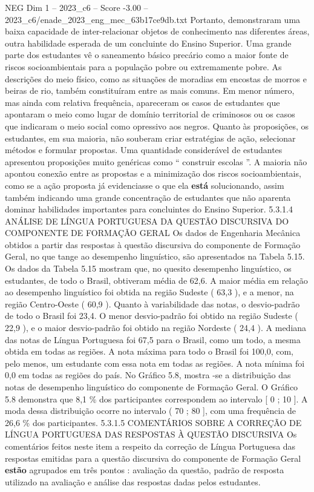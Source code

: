 \begin{textsample}{NEG Dim 1 – 2023\_c6 – Score -3.00 – 2023\_c6/enade\_2023\_eng\_mec\_63b17ce9db.txt}
Portanto, demonstraram uma baixa capacidade de inter-relacionar objetos de conhecimento nas diferentes áreas, outra habilidade esperada de um concluinte do Ensino Superior.
Uma grande parte dos estudantes vê o saneamento básico precário como a maior fonte de riscos socioambientais para a população pobre ou extremamente pobre.
As descrições do meio físico, como as situações de moradias em encostas de morros e beiras de rio, também constituíram entre as mais comuns.
Em menor número, mas ainda com relativa frequência, apareceram os casos de estudantes que apontaram o meio como lugar de domínio territorial de criminosos ou os casos que indicaram o meio social como opressivo aos negros.
Quanto às proposições, os estudantes, em sua maioria, não souberam criar estratégias de ação, selecionar métodos e formular propostas.
Uma quantidade considerável de estudantes apresentou proposições muito genéricas como “ construir escolas ”.
A maioria não apontou conexão entre as propostas e a minimização dos riscos socioambientais, como se a ação proposta já evidenciasse o que ela \textbf{está} solucionando, assim também indicando uma grande concentração de estudantes que não aparenta dominar habilidades importantes para concluintes do Ensino Superior. 5.3.1.4 ANÁLISE DE LÍNGUA PORTUGUESA DA QUESTÃO DISCURSIVA DO COMPONENTE DE FORMAÇÃO GERAL Os dados de Engenharia Mecânica obtidos a partir das respostas à questão discursiva do componente de Formação Geral, no que tange ao desempenho linguístico, são apresentados na Tabela 5.15.
Os dados da Tabela 5.15 mostram que, no quesito desempenho linguístico, os estudantes, de todo o Brasil, obtiveram média de 62,6.
A maior média em relação ao desempenho linguístico foi obtida na região Sudeste ( 63,3 ), e a menor, na região Centro-Oeste ( 60,9 ).
Quanto à variabilidade das notas, o desvio-padrão de todo o Brasil foi 23,4.
O menor desvio-padrão foi obtido na região Sudeste ( 22,9 ), e o maior desvio-padrão foi obtido na região Nordeste ( 24,4 ).
A mediana das notas de Língua Portuguesa foi 67,5 para o Brasil, como um todo, a mesma obtida em todas as regiões.
A nota máxima para todo o Brasil foi 100,0, com, pelo menos, um estudante com essa nota em todas as regiões.
A nota mínima foi 0,0 em todas as regiões do país.
No Gráfico 5.8, mostra -se a distribuição das notas de desempenho linguístico do componente de Formação Geral.
O Gráfico 5.8 demonstra que 8,1 \% dos participantes correspondem ao intervalo [ 0 ; 10 ].
A moda dessa distribuição ocorre no intervalo ( 70 ; 80 ], com uma frequência de 26,6 \% dos participantes. 5.3.1.5 COMENTÁRIOS SOBRE A CORREÇÃO DE LÍNGUA PORTUGUESA DAS RESPOSTAS À QUESTÃO DISCURSIVA Os comentários feitos neste item a respeito da correção de Língua Portuguesa das respostas emitidas para a questão discursiva do componente de Formação Geral \textbf{estão} agrupados em três pontos : avaliação da questão, padrão de resposta utilizado na avaliação e análise das respostas dadas pelos estudantes.

\end{textsample}
